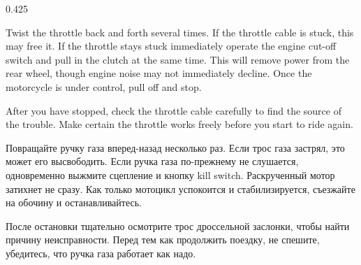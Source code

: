 


\begin{langblock}{0.425}
	\begin{eng}
	
	Twist the throttle back and forth several times. If the throttle cable is stuck, this may free it. If the throttle stays stuck immediately operate the engine cut-off switch and pull in the clutch at the same time. This will remove power from the rear wheel, though engine noise may not immediately decline. Once the motorcycle is under control, pull off and stop.
	
	After you have stopped, check the throttle cable carefully to find the source of the trouble. Make certain the throttle works freely before you start to ride again.
	\end{eng}
	\begin{rus}
		
	Повращайте ручку газа вперед-назад несколько раз. Если трос газа застрял, это может его высвободить. Если ручка газа по-прежнему не слушается,  одновременно выжмите сцепление и кнопку kill switch. Раскрученный мотор затихнет не сразу. Как только мотоцикл успокоится и стабилизируется, съезжайте на обочину и останавливайтесь.
	
	После остановки тщательно осмотрите трос дроссельной заслонки, чтобы найти причину неисправности. Перед тем как продолжить поездку, не спешите, убедитесь, что ручка газа работает как надо.
\end{rus}
\end{langblock}





